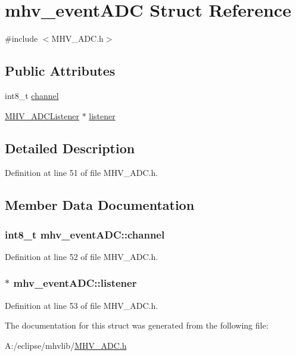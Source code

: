 \hypertarget{structmhv__event_a_d_c}{
\section{mhv\-\_\-event\-A\-D\-C \-Struct \-Reference}
\label{structmhv__event_a_d_c}
}


{\ttfamily \#include $<$\-M\-H\-V\-\_\-\-A\-D\-C.\-h$>$}

\subsection*{\-Public \-Attributes}
\begin{DoxyCompactItemize}
\item 
int8\-\_\-t \hyperlink{structmhv__event_a_d_c_a3c4932e6a013a8ad48327d1e89eaa623}{channel}
\item 
\hyperlink{class_m_h_v___a_d_c_listener}{\-M\-H\-V\-\_\-\-A\-D\-C\-Listener} $\ast$ \hyperlink{structmhv__event_a_d_c_a3688f1e9b5f4662afc7e892967229e46}{listener}
\end{DoxyCompactItemize}


\subsection{\-Detailed \-Description}


\-Definition at line 51 of file \-M\-H\-V\-\_\-\-A\-D\-C.\-h.



\subsection{\-Member \-Data \-Documentation}
\hypertarget{structmhv__event_a_d_c_a3c4932e6a013a8ad48327d1e89eaa623}{
\subsubsection[{channel}]{\setlength{\rightskip}{0pt plus 5cm}int8\-\_\-t {\bf mhv\-\_\-event\-A\-D\-C\-::channel}}}
\label{structmhv__event_a_d_c_a3c4932e6a013a8ad48327d1e89eaa623}


\-Definition at line 52 of file \-M\-H\-V\-\_\-\-A\-D\-C.\-h.

\hypertarget{structmhv__event_a_d_c_a3688f1e9b5f4662afc7e892967229e46}{
\subsubsection[{listener}]{$\ast$ {\bf mhv\-\_\-event\-A\-D\-C\-::listener}}}
\label{structmhv__event_a_d_c_a3688f1e9b5f4662afc7e892967229e46}


\-Definition at line 53 of file \-M\-H\-V\-\_\-\-A\-D\-C.\-h.



\-The documentation for this struct was generated from the following file\-:\begin{DoxyCompactItemize}
\item 
\-A\-:/eclipse/mhvlib/\hyperlink{_m_h_v___a_d_c_8h}{\-M\-H\-V\-\_\-\-A\-D\-C.\-h}\end{DoxyCompactItemize}
